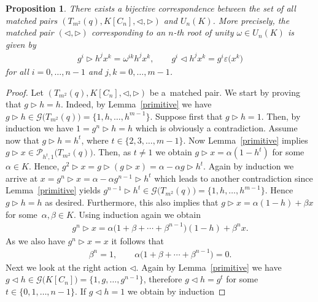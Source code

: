 \documentclass[11pt]{article}
\numberwithin{equation}{section}
\newtheorem{Proposition}[Theorem]{Proposition}
 { \theoremstyle{definition}
\newtheorem{Example}[Theorem]{Example}
\newtheorem{Remark}[Theorem]{Remark} }
\begin{document}
\begin{Proposition} \label{mapex1}
There exists a bijective correspondence between the set of all matched pairs $(T_{m^{2}}(q), K[C_n], \triangleleft, \triangleright)$ and $U_n (K)$. More precisely, the matched pair $(\triangleleft, \triangleright)$ corresponding to an $n$-th root of unity $\omega \in U_n (K)$ is given by
\begin{gather}\label{mp}
g^{i} \triangleright h^{j} x^{k} = \omega^{ik} h^{j} x^{k}, \qquad g^{i} \triangleleft h^{j} x^{k} = g^{i} \varepsilon\big(x^{k}\big)
\end{gather}
for all $i = 0,\dots, n-1$ and $j, k = 0,\dots, m-1$.
\end{Proposition}

\begin{proof} Let $(T_{m^{2}}(q), K[C_n], \triangleleft, \triangleright)$ be a~matched pair. We start by proving that $g \triangleright h = h$.
Indeed, by Lemma~\ref{primitive} we have $g \triangleright h \in \mathcal{G}\big(T_{m^{2}}(q)\big) = \{1, h,\dots,h^{m-1}\}$. Suppose first that $g \triangleright h = 1$. Then, by induction we have $1 = g^{n} \triangleright h = h$ which is obviously a contradiction. Assume now that $g \triangleright h = h^{t}$, where $t \in \{2, 3,\dots, m-1\}$. Now Lemma~\ref{primitive} implies $g \triangleright x \in \mathcal{P}_{h^{t}, 1}\big(T_{m^{2}}(q)\big)$. Then, as $t \neq 1$ we obtain $g \triangleright x = \alpha(1-h^{t})$ for some $\alpha \in K$. Hence, $g^{2} \triangleright x = g \triangleright (g \triangleright x) = \alpha - \alpha g \triangleright h^{t}$. Again by induction we arrive at $x = g^{n} \triangleright x = \alpha - \alpha g^{n-1} \triangleright h^{t}$ which leads to another contradiction since Lemma~\ref{primitive} yields $g^{n-1} \triangleright h^{t} \in \mathcal{G}\big(T_{m^{2}}(q)\big) = \{1, h,\dots,h^{m-1}\}$. Hence $g \triangleright h = h$ as desired. Furthermore, this
also implies that $g \triangleright x = \alpha(1-h)+ \beta x$ for some~$\alpha, \beta \in K$. Using induction again we obtain
\begin{gather*}
g^{n} \triangleright x = \alpha\big(1 + \beta + \cdots + \beta^{n-1}\big) (1-h) + \beta^{n} x.
\end{gather*}
As we also have $g^{n} \triangleright x = x$ it follows that
\begin{gather*}
\beta^{n} = 1, \qquad \alpha\big(1 + \beta + \cdots + \beta^{n-1}\big)=0.
\end{gather*}
Next we look at the right action $\triangleleft$. Again by Lemma~\ref{primitive} we have $g \triangleleft h \in \mathcal{G}\big(K[C_n]\big) = \{1, g,\dots, g^{n-1}\}$, therefore $g \triangleleft h = g^{t}$ for some $t \in \{0,1, \dots, n-1\}$. If $g \triangleleft h = 1$ we obtain by induction

\end{proof}
\end{document}
